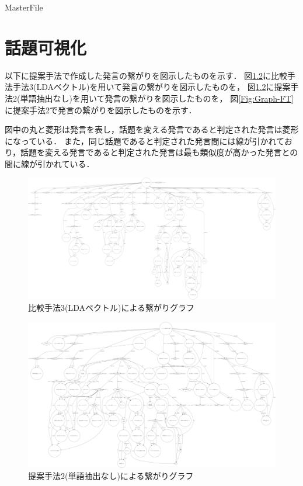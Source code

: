 \expandafter\ifx\csname MasterFile\endcsname\relax
\def\SubFile{hoge}


\fi
\cleardoublepage
\chapter[話題可視化]{話題可視化}
以下に提案手法で作成した発言の繋がりを図示したものを示す．
図\ref{Fig:Graph-Plain}に比較手法手法3(LDAベクトル)を用いて発言の繋がりを図示したものを，
図\ref{Fig:Graph-Plain}に提案手法2(単語抽出なし)を用いて発言の繋がりを図示したものを，
図\ref{Fig:Graph-FT}に提案手法2で発言の繋がりを図示したものを示す．

図中の丸と菱形は発言を表し，話題を変える発言であると判定された発言は菱形になっている．
また，同じ話題であると判定された発言間には線が引かれており，話題を変える発言であると判定された発言は最も類似度が高かった発言との間に線が引かれている．
\begin{figure}
	\centering
	\includegraphics[width=\textwidth]{../images/D.TopicGraph/binary_tree_theme8-APPR_LDA-min.png}
	\caption{比較手法3(LDAベクトル)による繋がりグラフ}
	\label{Fig:Graph-LDA}
\end{figure}
\begin{figure}
	\centering
	\includegraphics[width=\textwidth]{../images/D.TopicGraph/binary_tree_theme8-APPR_PLAIN-min.png}
	\caption{提案手法2(単語抽出なし)による繋がりグラフ}
	\label{Fig:Graph-Plain}
\end{figure}
